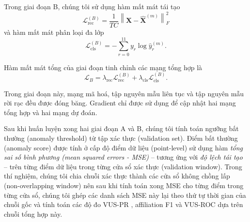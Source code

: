 Trong giai đoạn B, chúng tôi sử dụng hàm mất mát tái tạo
\begin{equation}
\mathcal{L}^{(B)}_{\mathrm{rec}}
=
\frac{1}{TC}
\left\|
\mathbf{X}
-
\widehat{\mathbf{X}}^{(m)}
\right\|_F^2
\end{equation}
và hàm mất mát phân loại đa lớp
\begin{equation}
\mathcal{L}^{(B)}_{\mathrm{cls}}
=
-
\sum_{r=0}^{11}
y_r
\log
\widehat{y}^{(m)}_{r}.
\end{equation}

Hàm mất mát tổng của giai đoạn tinh chỉnh các mạng tổng hợp là
\begin{equation}
\mathcal{L}_B
=
\lambda_{\mathrm{rec}}
\mathcal{L}^{(B)}_{\mathrm{rec}}
+
\lambda_{\mathrm{cls}}
\mathcal{L}^{(B)}_{\mathrm{cls}}.
\end{equation}

Trong giai đoạn này, mạng mã hoá, tập nguyên mẫu liên tục và tập nguyên mẫu rời rạc đều được đóng băng. Gradient chỉ được sử dụng để cập nhật hai mạng tổng hợp và hai mạng dự đoán.

Sau khi huấn luyện xong hai giai đoạn A và B, chúng tôi tính toán ngưỡng bất thường (anomaly threshold) từ tập xác thực (validation set). Điểm bất thường (anomaly score) được tính ở cấp độ điểm dữ liệu (point-level) sử dụng hàm \textit{tổng sai số bình phương (mean squared errors - MSE)} -- tương ứng với \textit{độ lệch tái tạo} -- trên từng điểm dữ liệu trong từng cửa sổ xác thực (validation window). Trong thí nghiệm, chúng tôi chia chuỗi xác thực thành các cửa sổ không chồng lấp (non-overlapping window) nên sau khi tính toán xong MSE cho từng điểm trong từng cửa sổ, chúng tôi ghép các danh sách MSE này lại theo thứ tự thời gian của chuỗi gốc và tính toán các độ đo VUS-PR \cite{boniol2025vus}, affiliation F1 \cite{10.1145/3534678.3539339} và VUS-ROC \cite{boniol2025vus} dựa trên chuỗi tổng hợp này.

